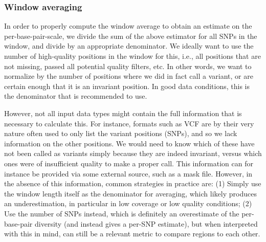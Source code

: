 \documentclass[letterpaper,fontsize=9pt,DIV=12]{scrartcl}
\begin{document}
\subsubsection*{Window averaging}
\label{supp:sec:ThetaPi:sub:PoolSequencing:sub:WindowAvg}

In order to properly compute the window average to obtain an estimate on the per-base-pair-scale, we divide the sum of the above estimator for all SNPs in the window, and divide by an appropriate denominator. We ideally want to use the number of high-quality positions in the window for this, i.e., all positions that are not missing, passed all potential quality filters, etc. In other words, we want to normalize by the number of positions where we did in fact call a variant, or are certain enough that it is an invariant position. In good data conditions, this is the denominator that is recommended to use.

However, not all input data types might contain the full information that is necessary to calculate this. For instance, formats such as VCF are by their very nature often used to only list the variant positions (SNPs), and so we lack information on the other positions. We would need to know which of these have not been called as variants simply because they are indeed invariant, versus which ones were of insufficient quality to make a proper call. This information can for instance be provided via some external source, such as a mask file. However, in the absence of this information, common strategies in practice are: (1) Simply use the window length itself as the denominator for averaging, which likely produces an underestimation, in particular in low coverage or low quality conditions; (2) Use the number of SNPs instead, which is definitely an overestimate of the per-base-pair diversity (and instead gives a per-SNP estimate), but when interpreted with this in mind, can still be a relevant metric to compare regions to each other.

%
\end{document}
